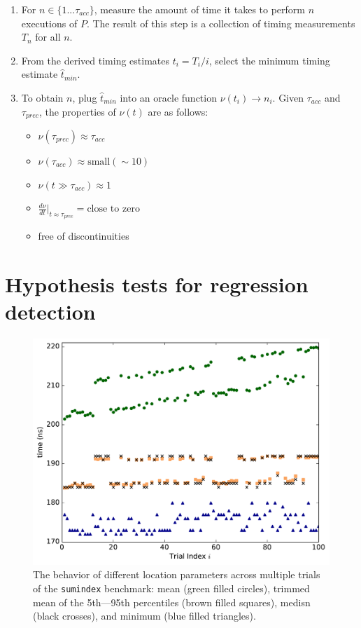 \documentclass[conference]{IEEEtran}
\begin{document}
\begin{enumerate}
    \item For $n \in \{1...\tau_{acc}\}$, measure the amount of time it takes to perform $n$
    executions of $P$. The result of this step is a collection of timing measurements $T_n$
    for all $n$.
    \item From the derived timing estimates $t_i = T_i / i$, select the minimum timing
    estimate $\hat{t}_{min}$.
    \item To obtain $n$, plug $\hat{t}_{min}$ into an oracle function $\nu(t_i) \to n_i$.
    Given $\tau_{acc}$ and $\tau_{prec}$, the properties of $\nu(t)$ are as follows:
    \begin{itemize}
        \item $\nu(\tau_{prec}) \approx \tau_{acc}$
        \item $\nu(\tau_{acc}) \approx \text{small} (\sim 10)$
        \item $\nu(t \gg \tau_{acc}) \approx 1$
        \item $\frac{d\nu}{dt}\big|_{t \approx \tau_{prec}} = \text{close to zero}$
        \item free of discontinuities 
    \end{itemize}
\end{enumerate}

\label{sec:hypotesting}
\section{Hypothesis tests for regression detection}

\begin{figure}
\centering
\includegraphics[width=\columnwidth]{figures/fig3/location_estimators_sumindex}
\caption{The behavior of different location parameters across multiple trials of
the \lstinline|sumindex| benchmark: mean (green filled circles), trimmed mean of
the 5th---95th percentiles (brown filled squares), medisn (black crosses), and
minimum (blue filled triangles).}
\label{fig:locationmeasures}
\end{figure}
\end{document}
